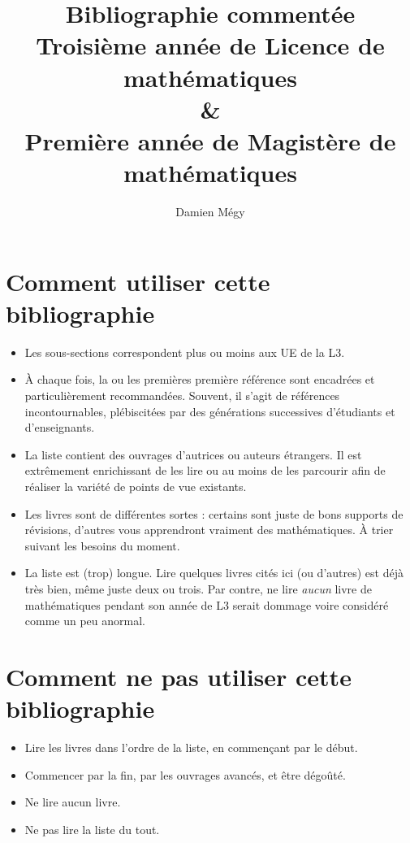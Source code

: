 \documentclass{article}
\begin{document}
\author{Damien Mégy}
\title{Bibliographie commentée\\Troisième année de Licence de mathématiques \\ \&\\ Première année de Magistère de mathématiques}

\maketitle
\tableofcontents


\section*{Comment utiliser cette bibliographie}
\begin{itemize}
\item Les sous-sections correspondent plus ou moins aux UE de la L3.
\item À chaque fois, la ou les premières première référence sont encadrées et  particulièrement recommandées. Souvent, il s'agit de références incontournables, plébiscitées par des générations successives d'étudiants et d'enseignants. 
\item La liste contient des ouvrages d'autrices ou auteurs étrangers. Il est  extrêmement enrichissant de les lire ou au moins de les parcourir afin de réaliser la variété de points de vue existants.
\item Les livres sont de différentes sortes : certains sont juste de bons supports de révisions, d'autres vous apprendront vraiment des mathématiques. À trier suivant les besoins du moment.
\item La liste est (trop) longue. Lire quelques livres cités ici (ou d'autres) est déjà très bien, même juste deux ou trois. Par contre, ne lire \emph{aucun} livre de mathématiques pendant son année de L3 serait dommage voire considéré comme un peu anormal. 
\end{itemize}

\section*{Comment ne pas utiliser cette bibliographie}
\begin{itemize}
\item Lire les livres dans l'ordre de la liste, en commençant par le début.
\item Commencer par la fin, par les ouvrages avancés, et être dégoûté.
\item Ne lire aucun livre.
\item Ne pas lire la liste du tout.
\end{itemize}
\end{document}
